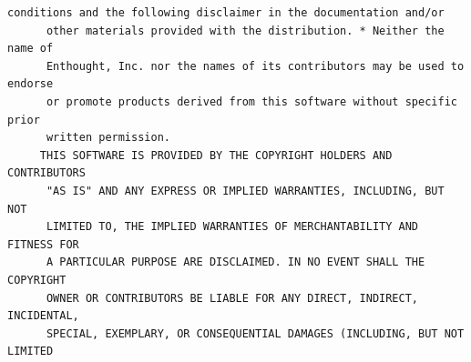 \begin{lstlisting}[basicstyle=\ttfamily\footnotesize,breaklines=true]
      conditions and the following disclaimer in the documentation and/or
      other materials provided with the distribution. * Neither the name of
      Enthought, Inc. nor the names of its contributors may be used to endorse
      or promote products derived from this software without specific prior
      written permission.
     THIS SOFTWARE IS PROVIDED BY THE COPYRIGHT HOLDERS AND CONTRIBUTORS
      "AS IS" AND ANY EXPRESS OR IMPLIED WARRANTIES, INCLUDING, BUT NOT
      LIMITED TO, THE IMPLIED WARRANTIES OF MERCHANTABILITY AND FITNESS FOR
      A PARTICULAR PURPOSE ARE DISCLAIMED. IN NO EVENT SHALL THE COPYRIGHT
      OWNER OR CONTRIBUTORS BE LIABLE FOR ANY DIRECT, INDIRECT, INCIDENTAL,
      SPECIAL, EXEMPLARY, OR CONSEQUENTIAL DAMAGES (INCLUDING, BUT NOT LIMITED





\end{lstlisting}
